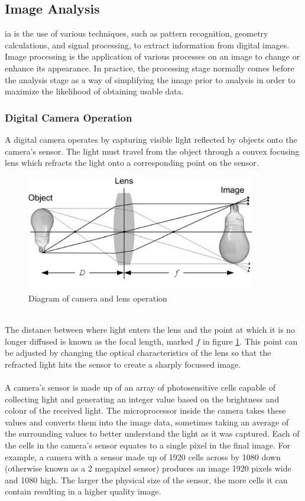 \subsection{Image Analysis}
	\gls{ia} is the use of various techniques, such as pattern recognition, geometry calculations, and signal processing, to extract information from digital images. Image processing is the application of various processes on an image to change or enhance its appearance. In practice, the processing stage normally comes before the analysis stage as a way of simplifying the image prior to analysis in order to maximize the likelihood of obtaining usable data.
	\subsubsection{Digital Camera Operation}
		A digital camera operates by capturing visible light reflected by objects onto the camera’s sensor. The light must travel from the object through a convex focusing lens which refracts the light onto a corresponding point on the sensor.
		\begin{figure}[h!]
			\centering
			\includegraphics[width=10cm]{../images/camera_bulb.PNG}
			\caption{Diagram of camera and lens operation \citep{introtoprocessing}}
			\label{fig:camera_diagram}
		\end{figure}
		\\
		The distance between where light enters the lens and the point at which it is no longer diffused is known as the focal length, marked $f$ in figure \ref{fig:camera_diagram}. This point can be adjusted by changing the optical characteristics of the lens so that the refracted light hits the sensor to create a sharply focussed image.
		\\\\
		A camera’s sensor is made up of an array of photosensitive cells capable of collecting light and generating an integer value based on the brightness and colour of the received light. The microprocessor inside the camera takes these values and converts them into the image data, sometimes taking an average of the surrounding values to better understand the light as it was captured. Each of the cells in the camera’s sensor equates to a single pixel in the final image. For example, a camera with a sensor made up of 1920 cells across by 1080 down (otherwise known as a 2 megapixel sensor) produces an image 1920 pixels wide and 1080 high. The larger the physical size of the sensor, the more cells it can contain resulting in a higher quality image.
